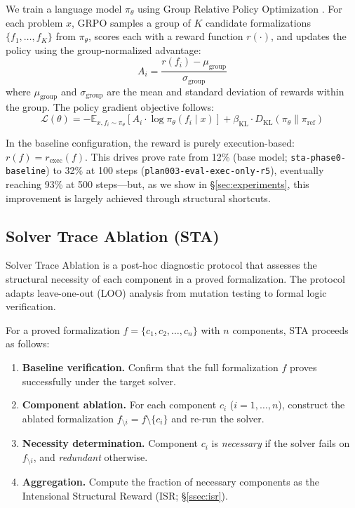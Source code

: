 We train a language model $\pi_\theta$ using Group Relative Policy Optimization \citep[GRPO;][]{shao2024deepseekmath}. For each problem $x$, GRPO samples a group of $K$ candidate formalizations $\{f_1, \ldots, f_K\}$ from $\pi_\theta$, scores each with a reward function $r(\cdot)$, and updates the policy using the group-normalized advantage:
\begin{equation}
    A_i = \frac{r(f_i) - \mu_{\text{group}}}{\sigma_{\text{group}}}
    \label{eq:advantage}
\end{equation}
where $\mu_{\text{group}}$ and $\sigma_{\text{group}}$ are the mean and standard deviation of rewards within the group. The policy gradient objective follows:
\begin{equation}
    \mathcal{L}(\theta) = -\mathbb{E}_{x, f_i \sim \pi_\theta} \left[ A_i \cdot \log \pi_\theta(f_i \mid x) \right] + \beta_{\text{KL}} \cdot D_{\text{KL}}(\pi_\theta \| \pi_{\text{ref}})
    \label{eq:grpo}
\end{equation}

In the baseline configuration, the reward is purely execution-based: $r(f) = r_{\text{exec}}(f)$. This drives prove rate from 12\% (base model; \texttt{sta-phase0-baseline}) to 32\% at 100 steps (\texttt{plan003-eval-exec-only-r5}), eventually reaching 93\% at 500 steps---but, as we show in \S\ref{sec:experiments}, this improvement is largely achieved through structural shortcuts.

\subsection{Solver Trace Ablation (STA)}
\label{ssec:sta}

Solver Trace Ablation is a post-hoc diagnostic protocol that assesses the structural necessity of each component in a proved formalization. The protocol adapts leave-one-out (LOO) analysis from mutation testing \citep{demillo1978hints, jia2011analysis} to formal logic verification.

For a proved formalization $f = \{c_1, c_2, \ldots, c_n\}$ with $n$ components, STA proceeds as follows:

\begin{enumerate}
    \item \textbf{Baseline verification.} Confirm that the full formalization $f$ proves successfully under the target solver.
    \item \textbf{Component ablation.} For each component $c_i$ ($i = 1, \ldots, n$), construct the ablated formalization $f_{\setminus i} = f \setminus \{c_i\}$ and re-run the solver.
    \item \textbf{Necessity determination.} Component $c_i$ is \emph{necessary} if the solver fails on $f_{\setminus i}$, and \emph{redundant} otherwise.
    \item \textbf{Aggregation.} Compute the fraction of necessary components as the Intensional Structural Reward (ISR; \S\ref{ssec:isr}).
\end{enumerate}

